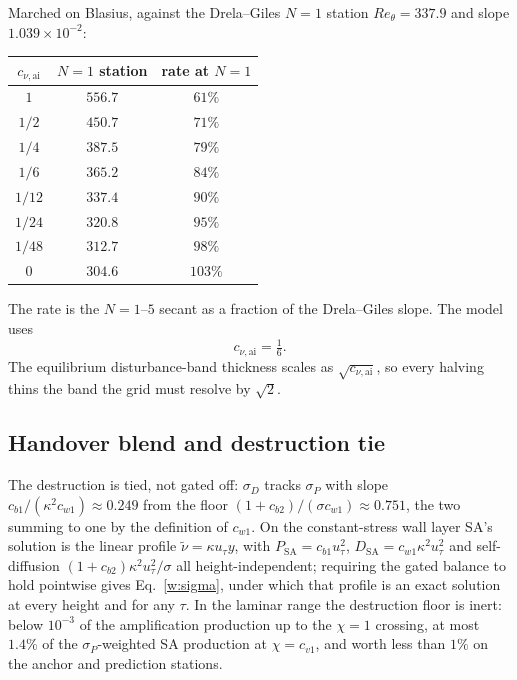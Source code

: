 \documentclass[10pt]{article}
\begin{document}
Marched on Blasius, against the Drela--Giles $N\!=\!1$ station
$Re_\theta=337.9$ and slope $1.039\times10^{-2}$:
%
\begin{center}\small
\begin{tabular}{ccc}
  \toprule
  $c_{\nu,\mathrm{ai}}$ & $N\!=\!1$ station & rate at $N\!=\!1$ \\
  \midrule
  $1$            & $556.7$ & $61\%$ \\
  $1/2$          & $450.7$ & $71\%$ \\
  $1/4$          & $387.5$ & $79\%$ \\
  $1/6$          & $365.2$ & $84\%$ \\
  $1/12$         & $337.4$ & $90\%$ \\
  $1/24$         & $320.8$ & $95\%$ \\
  $1/48$         & $312.7$ & $98\%$ \\
  $0$            & $304.6$ & $103\%$ \\
  \bottomrule
\end{tabular}
\end{center}
%
The rate is the $N\!=\!1$--$5$ secant as a fraction of the Drela--Giles
slope. The model uses
\begin{equation*}
  c_{\nu,\mathrm{ai}}=\tfrac16 .
\end{equation*}
The equilibrium disturbance-band thickness scales as
$\sqrt{c_{\nu,\mathrm{ai}}}$, so every halving thins the band the grid
must resolve by $\sqrt2$.

\subsection{Handover blend and destruction tie}

The destruction is tied, not gated off: $\sigma_D$ tracks $\sigma_P$ with
slope $c_{b1}/(\kappa^2c_{w1})\approx0.249$ from the floor
$(1+c_{b2})/(\sigma c_{w1})\approx0.751$, the two summing to one by the
definition of $c_{w1}$. On the constant-stress wall layer SA's solution is
the linear profile $\tilde\nu=\kappa u_\tau y$, with
$P_\mathrm{SA}=c_{b1}u_\tau^2$,
$D_\mathrm{SA}=c_{w1}\kappa^2u_\tau^2$ and self-diffusion
$(1+c_{b2})\kappa^2u_\tau^2/\sigma$ all height-independent; requiring the
gated balance to hold pointwise gives Eq.~\eqref{w:sigma}, under which that
profile is an exact solution at every height and for any $\tau$. In the
laminar range the destruction floor is inert: below $10^{-3}$ of the
amplification production up to the $\chi=1$ crossing, at most $1.4\%$ of the
$\sigma_P$-weighted SA production at $\chi=c_{v1}$, and worth less than $1\%$
on the anchor and prediction stations.
\end{document}
